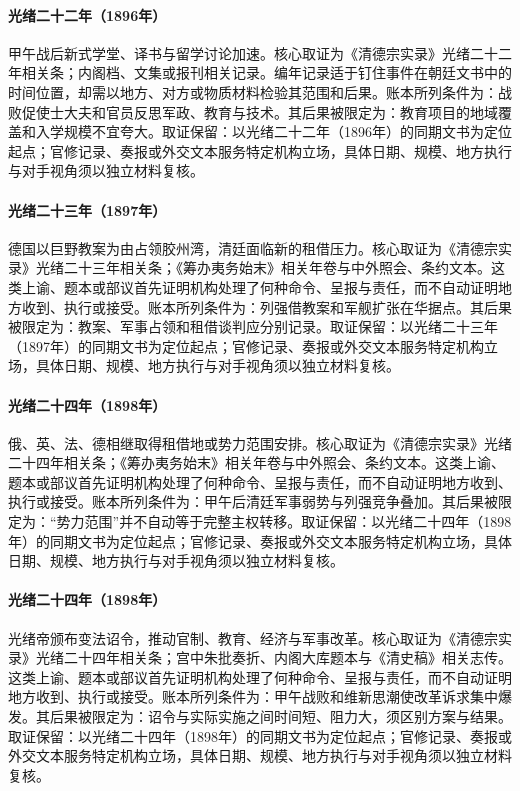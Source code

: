 \hypertarget{ledger:EQ-1896-MODERN-EDUCATION-EXPANSION}{}\paragraph{光绪二十二年（1896年）}甲午战后新式学堂、译书与留学讨论加速。核心取证为《清德宗实录》光绪二十二年相关条；内阁档、文集或报刊相关记录。编年记录适于钉住事件在朝廷文书中的时间位置，却需以地方、对方或物质材料检验其范围和后果。账本所列条件为：战败促使士大夫和官员反思军政、教育与技术。其后果被限定为：教育项目的地域覆盖和入学规模不宜夸大。取证保留：以光绪二十二年（1896年）的同期文书为定位起点；官修记录、奏报或外交文本服务特定机构立场，具体日期、规模、地方执行与对手视角须以独立材料复核。
\hypertarget{ledger:EQ-1897-JIAOZHOU-BAY-OCCUPATION}{}\paragraph{光绪二十三年（1897年）}德国以巨野教案为由占领胶州湾，清廷面临新的租借压力。核心取证为《清德宗实录》光绪二十三年相关条；《筹办夷务始末》相关年卷与中外照会、条约文本。这类上谕、题本或部议首先证明机构处理了何种命令、呈报与责任，而不自动证明地方收到、执行或接受。账本所列条件为：列强借教案和军舰扩张在华据点。其后果被限定为：教案、军事占领和租借谈判应分别记录。取证保留：以光绪二十三年（1897年）的同期文书为定位起点；官修记录、奏报或外交文本服务特定机构立场，具体日期、规模、地方执行与对手视角须以独立材料复核。
\hypertarget{ledger:EQ-1898-LEASED-TERRITORIES}{}\paragraph{光绪二十四年（1898年）}俄、英、法、德相继取得租借地或势力范围安排。核心取证为《清德宗实录》光绪二十四年相关条；《筹办夷务始末》相关年卷与中外照会、条约文本。这类上谕、题本或部议首先证明机构处理了何种命令、呈报与责任，而不自动证明地方收到、执行或接受。账本所列条件为：甲午后清廷军事弱势与列强竞争叠加。其后果被限定为：“势力范围”并不自动等于完整主权转移。取证保留：以光绪二十四年（1898年）的同期文书为定位起点；官修记录、奏报或外交文本服务特定机构立场，具体日期、规模、地方执行与对手视角须以独立材料复核。
\hypertarget{ledger:EQ-1898-HUNDRED-DAYS-REFORM}{}\paragraph{光绪二十四年（1898年）}光绪帝颁布变法诏令，推动官制、教育、经济与军事改革。核心取证为《清德宗实录》光绪二十四年相关条；宫中朱批奏折、内阁大库题本与《清史稿》相关志传。这类上谕、题本或部议首先证明机构处理了何种命令、呈报与责任，而不自动证明地方收到、执行或接受。账本所列条件为：甲午战败和维新思潮使改革诉求集中爆发。其后果被限定为：诏令与实际实施之间时间短、阻力大，须区别方案与结果。取证保留：以光绪二十四年（1898年）的同期文书为定位起点；官修记录、奏报或外交文本服务特定机构立场，具体日期、规模、地方执行与对手视角须以独立材料复核。
